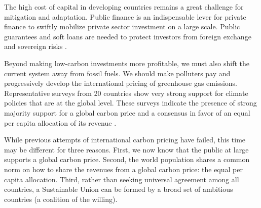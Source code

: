 \documentclass[12pt,english]{article}
\begin{document}
\begin{bibunit}
The high cost of capital in developing countries remains a great challenge for mitigation and adaptation. Public finance is an indispensable lever for private finance to swiftly mobilize private sector investment on a large scale. Public guarantees and soft loans are needed to protect investors from foreign exchange and sovereign risks \citep{hourcade_climate_2025}.

Beyond making low-carbon investments more profitable, we must also shift the current system away from fossil fuels. We should make polluters pay and progressively develop the international pricing of greenhouse gas emissions. Representative surveys from 20 countries show very strong support for climate policies that are at the global level. These surveys indicate the presence of strong majority support for a global carbon price and a consensus in favor of an equal per capita allocation of its revenue \citep{fabre_majority_2025}.

While previous attempts of international carbon pricing have failed, this time may be different for three reasons. First, we now know that the public at large supports a global carbon price. Second, the world population shares a common norm on how to share the revenues from a global carbon price: the equal per capita allocation. Third, rather than seeking universal agreement among all countries, a Sustainable Union can be formed by a broad set of ambitious countries (a coalition of the willing).


\end{bibunit}
\end{document}
